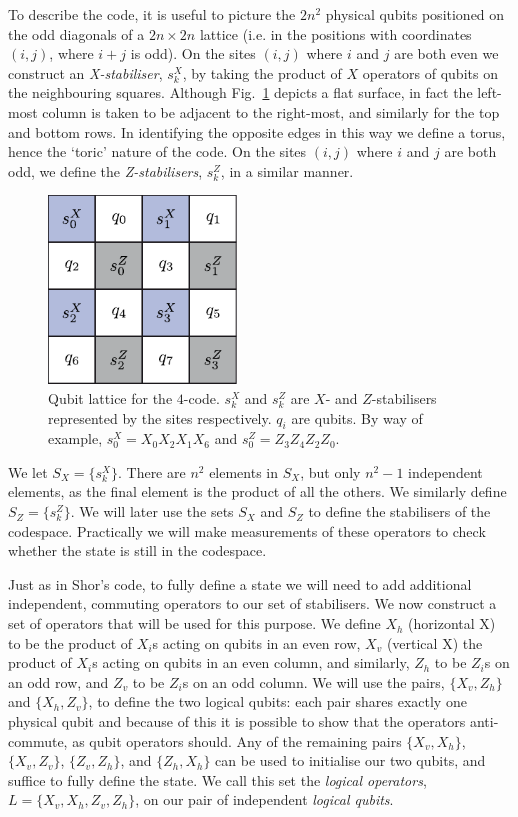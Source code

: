 To describe the code, it is useful to picture the $2n^2$ physical qubits positioned on the odd diagonals of a $2n \times 2n$ lattice (i.e. in the positions with coordinates $(i,j)$, where $i+j$ is odd). On the sites $(i, j)$ where $i$ and $j$ are both even we construct an \textit{X-stabiliser}, $s^X_{k}$, by taking the product of $X$ operators of qubits on the neighbouring squares. Although Fig.~\ref{4-code} depicts a flat surface, in fact the left-most column is taken to be adjacent to the right-most, and similarly for the top and bottom rows. In identifying the opposite edges in this way we define a torus, hence the `toric' nature of the code. On the sites $(i,j)$ where $i$ and $j$ are both odd, we define the \textit{Z-stabilisers}, $s^Z_{k}$, in a similar manner.
\begin{figure}[htb]
  \begin{center}
    \includegraphics[width=5cm]{assets/4-code.pdf}
  \end{center}
  \caption{Qubit lattice for the $4$-code. $s_{k}^X$ and $s_{k}^Z$ are $X$- and $Z$-stabilisers represented by the sites respectively. $q_i$ are qubits. By way of example, $s_{0}^X = X_0 X_2 X_1 X_6$ and $s_{0}^Z = Z_3 Z_4 Z_2 Z_0$.}
  \label{4-code}
\end{figure}

We let $S_X = \{s^X_{k}\}$. There are $n^2$ elements in $S_X$, but only $n^2-1$ independent elements, as the final element is the product of all the others. We similarly define $S_Z = \{s^Z_{k}\}$. We will later use the sets $S_X$ and $S_Z$ to define the stabilisers of the codespace. Practically we will make measurements of these operators to check whether the state is still in the codespace. 

Just as in Shor's code, to fully define a state we will need to add additional independent, commuting operators to our set of stabilisers. We now construct a set of operators that will be used for this purpose. We define $X_h$ (horizontal X) to be the product of $X_i$s acting on qubits in an even row, $X_v$ (vertical X) the product of $X_i$s acting on qubits in an even column, and similarly, $Z_h$ to be $Z_i$s on an odd row, and $Z_v$ to be $Z_i$s on an odd column. We will use the pairs, $\{X_v, Z_h\}$ and $\{X_h, Z_v\}$, to define the two logical qubits: each pair shares exactly one physical qubit and because of this it is possible to show that the operators anti-commute, as qubit operators should.  Any of the remaining pairs $\{X_v, X_h\}$, $\{X_v, Z_v\}$, $\{Z_v, Z_h\}$, and $\{Z_h, X_h\}$ can be used to initialise our two qubits, and suffice to fully define the state. We call this set the \textit{logical operators}, $L = \{X_v, X_h, Z_v , Z_h\}$, on our pair of independent \textit{logical qubits}. 

